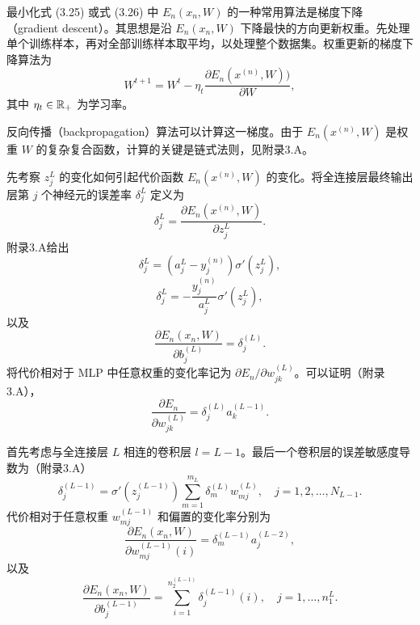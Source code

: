 
最小化式 (3.25) 或式 (3.26) 中 $E_n(x_n,W)$ 的一种常用算法是梯度下降（gradient descent）。其思想是沿 $E_n(x_n,W)$ 下降最快的方向更新权重。先处理单个训练样本，再对全部训练样本取平均，以处理整个数据集。权重更新的梯度下降算法为
\begin{equation}
W^{t+1}=W^t-\eta_t\frac{\partial E_n(x^{(n)},W))}{\partial W},
\tag{3.27}
\end{equation}
其中 $\eta_t\in\mathbb{R}_+$ 为学习率。

反向传播（backpropagation）算法可以计算这一梯度。由于 $E_n(x^{(n)},W)$ 是权重 $W$ 的复杂复合函数，计算的关键是链式法则，见附录3.A。

先考察 $z_j^L$ 的变化如何引起代价函数 $E_n(x^{(n)},W)$ 的变化。将全连接层最终输出层第 $j$ 个神经元的误差率 $\delta_j^L$ 定义为
\[
\delta_j^L=\frac{\partial E_n(x^{(n)},W)}{\partial z_j^L}.
\]
附录3.A给出
\begin{equation}
\delta_j^L=(a_j^L-y_j^{(n)})\sigma'(z_j^L),
\tag{3.28}
\end{equation}
\begin{equation}
\delta_j^L=-\frac{y_j^{(n)}}{a_j^L}\sigma'(z_j^L),
\tag{3.29}
\end{equation}
以及
\begin{equation}
\frac{\partial E_n(x_n,W)}{\partial b_j^{(L)}}=\delta_j^{(L)}.
\tag{3.30}
\end{equation}
将代价相对于 MLP 中任意权重的变化率记为 $\partial E_n/\partial w_{jk}^{(L)}$。可以证明（附录3.A），
\begin{equation}
\frac{\partial E_n}{\partial w_{jk}^{(L)}}
=\delta_j^{(L)}a_k^{(L-1)}.
\tag{3.31}
\end{equation}


首先考虑与全连接层 $L$ 相连的卷积层 $l=L-1$。最后一个卷积层的误差敏感度导数为（附录3.A）
\begin{equation}
\delta_j^{(L-1)}
=\sigma'(z_j^{(L-1)})
\sum_{m=1}^{m_L}\delta_m^{(L)}w_{mj}^{(L)},
\quad j=1,2,\ldots,N_{L-1}.
\tag{3.32}
\end{equation}
代价相对于任意权重 $w_{mj}^{(L-1)}$ 和偏置的变化率分别为
\begin{equation}
\frac{\partial E_n(x_n,W)}{\partial w_{mj}^{(L-1)}(i)}
=\delta_m^{(L-1)}a_j^{(L-2)},
\tag{3.33}
\end{equation}
以及
\begin{equation}
\frac{\partial E_n(x_n,W)}{\partial b_j^{(L-1)}}
=\sum_{i=1}^{n_2^{(L-1)}}\delta_j^{(L-1)}(i),
\quad j=1,\ldots,n_1^L.
\tag{3.34}
\end{equation}

